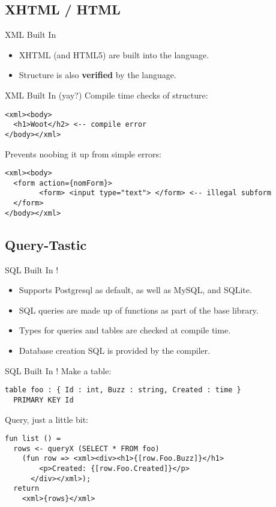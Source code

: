 \documentclass{beamer}
\begin{document}
\subsection{XHTML / HTML}
\begin{frame}{XML Built In}

\begin{itemize}
\item XHTML (and HTML5) are built into the language.\\
\item Structure is also \textbf{verified} by the language.
\end{itemize}
\end{frame}

\begin{frame}[fragile]{XML Built In (yay?)}
Compile time checks of structure:
\begin{verbatim}
<xml><body>
  <h1>Woot</h2> <-- compile error
</body></xml>
\end{verbatim}
Prevents noobing it up from simple errors:
\begin{verbatim}
<xml><body>
  <form action={nomForm}>
		<form> <input type="text"> </form> <-- illegal subform
  </form>
</body></xml>
\end{verbatim}
\end{frame}

\subsection{Query-Tastic}
\begin{frame}{SQL Built In !}

\begin{itemize}
\item Supports Postgresql as default, as well as MySQL, and SQLite.
\item SQL queries are made up of functions as part of the base library.
\item Types for queries and tables are checked at compile time.
\item Database creation SQL is provided by the compiler.
\end{itemize}
\end{frame}
\begin{frame}[fragile]{SQL Built In !}
Make a table:
\begin{verbatim}
table foo : { Id : int, Buzz : string, Created : time }
  PRIMARY KEY Id
\end{verbatim}
Query, just a little bit:
\begin{verbatim}
fun list () =
  rows <- queryX (SELECT * FROM foo)
    (fun row => <xml><div><h1>{[row.Foo.Buzz]}</h1>
        <p>Created: {[row.Foo.Created]}</p>
      </div></xml>);
  return
    <xml>{rows}</xml>
\end{verbatim}
\end{frame}
\end{document}

